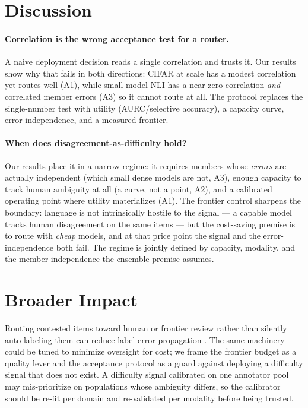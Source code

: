 \documentclass[letterpaper]{article} %
\begin{document}
\section{Discussion}

\paragraph{Correlation is the wrong acceptance test for a router.}
A naive deployment decision reads a single correlation and trusts it. Our results
show why that fails in both directions: CIFAR at scale has a modest correlation yet
routes well (A1), while small-model NLI has a near-zero correlation \emph{and}
correlated member errors (A3) so it cannot route at all. The protocol replaces the
single-number test with utility (AURC/selective accuracy), a capacity curve,
error-independence, and a measured frontier.

\paragraph{When does disagreement-as-difficulty hold?}
Our results place it in a narrow regime: it requires members whose \emph{errors}
are actually independent (which small dense models are not, A3), enough capacity to
track human ambiguity at all (a curve, not a point, A2), and a calibrated operating
point where utility materializes (A1). The frontier control sharpens the boundary:
language is not intrinsically hostile to the signal --- a capable model tracks human
disagreement on the same items --- but the cost-saving premise is to route with
\emph{cheap} models, and at that price point the signal and the error-independence
both fail. The regime is jointly defined by capacity, modality, and the
member-independence the ensemble premise assumes.

\section{Broader Impact}
Routing contested items toward human or frontier review rather than silently
auto-labeling them can reduce label-error propagation
\citep{northcutt2021pervasive}. The same machinery could be tuned to minimize
oversight for cost; we frame the frontier budget as a quality lever and the
acceptance protocol as a guard against deploying a difficulty signal that does not
exist. A difficulty signal calibrated on one annotator pool may mis-prioritize on
populations whose ambiguity differs, so the calibrator should be re-fit per domain
and re-validated per modality before being trusted.
\end{document}
